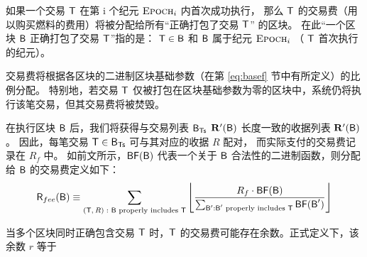 如果一个交易 $\textsf{T}$ 在第 i 个纪元 $\textsc{Epoch}_i$ 内首次成功执行，
那么 $\textsf{T}$ 的交易费（用以购买燃料的费用）将被分配给所有“正确打包了交易 $\textsf{T}$” 的区块。
在此“一个区块 $\textsf{B}$ 正确打包了交易 $\textsf{T}$”指的是： 
$\textsf{T}\in \textsf{B}$ 和 $\textsf{B}$ 属于纪元 $\textsc{Epoch}_i$ （ $\textsf{T}$ 首次执行的纪元）。


交易费将根据各区块的二进制区块基础参数（在第 \ref{eq:basef} 节中有所定义）的比例分配。
特别地，若交易 $\textsf{T}$ 仅被打包在区块基础参数为零的区块中，系统仍将执行该笔交易，但其交易费将被焚毁。


在执行区块 $\textsf{B}$ 后，我们将获得与交易列表 $\textsf{B}_{\textsf{Ts}}$ $\mathbf{R}'(\textsf{B})$ 长度一致的收据列表 $\mathbf{R}'(\textsf{B})$。
因此，每笔交易 $\textsf{T}\in \textsf{B}_{\textsf{Ts}}$ 可与其对应的收据 $R$ 配对，
而实际支付的交易费记录在 $R_f$ 中。
如前文所示，$\mathsf{BF}(\textsf{B})$ 代表一个关于 $\textsf{B}$ 合法性的二进制函数，则分配给 $\textsf{B}$ 的交易费定义如下：
\begin{align}\label{eq:txfee}
	\textsf{R}_{fee}(\textsf{B})\equiv
		 \sum_{\text{$(\textsf{T},R):$ $\textsf{B}$ properly includes $\textsf{T}$}}
		 \left\lfloor
	\frac{R_f \cdot\mathsf{BF}(\textsf{B})}{\sum_{\textsf{B}': \text{$\textsf{B}'$ properly includes $\textsf{T}$}} \mathsf{BF}(\textsf{B}') }
		 \right\rfloor
\end{align}

当多个区块同时正确包含交易 $\textsf{T}$ 时，$\textsf{T}$ 的交易费可能存在余数。正式定义下，该余数 $r$ 等于

